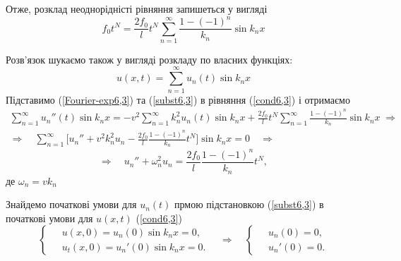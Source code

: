 Отже, розклад неоднорідністі рівняння запишеться у вигляді
\begin{equation}
    f_0 t^N = \frac{2f_0}{l} t^N \sum_{n=1}^\infty \frac{1 - (-1)^n}{k_n} \sin k_nx    
\end{equation}

Розв'язок шукаємо також у вигляді розкладу по власних функціях:
\begin{equation} \label{subst6,3}
    u(x,t) = \sum_{n=1}^\infty u_n(t) \sin k_nx
\end{equation} 
Підставимо (\ref{Fourier-exp6,3}) та (\ref{subst6,3}) в рівняння (\ref{cond6,3}) і отримаємо
\begin{equation*}
    \begin{gathered}
        \sum_{n=1}^\infty u_n''(t) \sin k_nx = -v^2 \sum_{n=1}^\infty k_n^2 u_n(t) \sin k_nx + \frac{2f_0}{l} t^N \sum_{n=1}^\infty \frac{1 - (-1)^n}{k_n} \sin k_nx 
        \;\Rightarrow\\
        \Rightarrow\quad
        \sum_{n=1}^\infty \bigg[u_n'' + v^2k_n^2u_n - \frac{2f_0}{l} \frac{1 - (-1)^n}{k_n} t^N \bigg] \sin k_nx = 0
        \quad\Rightarrow
    \end{gathered}
\end{equation*}
\begin{equation} \label{time-eq6,3}
    \Rightarrow\quad
    u_n'' + \omega_n^2 u_n = \frac{2f_0}{l} \frac{1 - (-1)^n}{k_n} t^N,
\end{equation}
де $\omega_n = vk_n$ 

Знайдемо початкові умови для $u_n(t)$ прмою підстановкою (\ref{subst6,3}) в початкові умови для $u(x,t)$ (\ref{cond6,3})
\begin{equation} \label{new-init-cond6,3}
    \left\{ \begin{aligned}
        \;&u(x,0) = u_n(0)\sin k_nx = 0,\\
        &u_t(x,0) = u_n'(0)\sin k_nx = 0.
    \end{aligned} \right.
    \quad\Rightarrow\quad
    \left\{ \begin{aligned}
        \;&u_n(0) = 0,\\
        &u_n'(0) = 0.
    \end{aligned} \right.
\end{equation}

